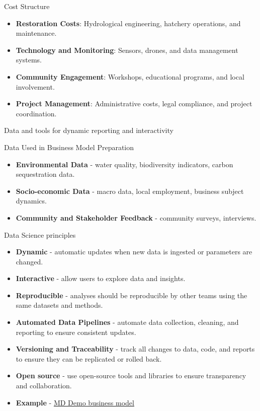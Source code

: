\documentclass[
  ignorenonframetext,
]{beamer}
\providecommand{\tightlist}{%
  \setlength{\itemsep}{0pt}\setlength{\parskip}{0pt}}\usepackage{longtable,booktabs,array}
\begin{document}
\begin{frame}{Cost Structure}
\label{cost-structure}
\begin{itemize}
\tightlist
\item
  \textbf{Restoration Costs}: Hydrological engineering, hatchery
  operations, and maintenance.
\item
  \textbf{Technology and Monitoring}: Sensors, drones, and data
  management systems.
\item
  \textbf{Community Engagement}: Workshops, educational programs, and
  local involvement.
\item
  \textbf{Project Management}: Administrative costs, legal compliance,
  and project coordination.
\end{itemize}
\end{frame}

\begin{frame}{Data and tools for dynamic reporting and interactivity}
\label{data-and-tools-for-dynamic-reporting-and-interactivity}
\end{frame}

\begin{frame}{Data Used in Business Model Preparation}
\label{data-used-in-business-model-preparation}
\begin{itemize}
\tightlist
\item
  \textbf{Environmental Data} - water quality, biodiversity indicators,
  carbon sequestration data.
\item
  \textbf{Socio-economic Data} - macro data, local employment, business
  subject dynamics.
\item
  \textbf{Community and Stakeholder Feedback} - community surveys,
  interviews.
\end{itemize}
\end{frame}

\begin{frame}{Data Science principles}
\label{data-science-principles}
\begin{itemize}
\tightlist
\item
  \textbf{Dynamic} - automatic updates when new data is ingested or
  parameters are changed.
\item
  \textbf{Interactive} - allow users to explore data and insights.
\item
  \textbf{Reproducible} - analyses should be reproducible by other teams
  using the same datasets and methods.
\item
  \textbf{Automated Data Pipelines} - automate data collection,
  cleaning, and reporting to ensure consistent updates.
\item
  \textbf{Versioning and Traceability} - track all changes to data,
  code, and reports to ensure they can be replicated or rolled back.
\item
  \textbf{Open source} - use open-source tools and libraries to ensure
  transparency and collaboration.
\item
  \textbf{Example} - \href{https://forensis.shinyapps.io/dawetrest/}{MD
  Demo business model}
\end{itemize}
\end{frame}

\begin{frame}{}
\label{section-1}
\end{frame}
\end{document}
